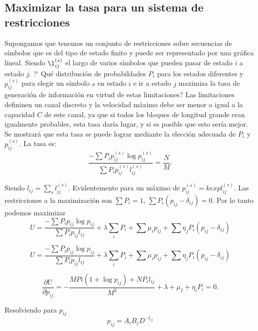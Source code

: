 \begin{appendices}
\clearpage

\chapter{Maximizar la tasa para un sistema de restricciones}
\label{a4}

Supongamos que tenemos un conjunto de restricciones sobre secuencias
de s\'imbolos que es del tipo de estado finito y puede ser
representado por una gr\'afica lineal. Siendo $\l_{ij}^{(s)}$ el largo
de varios s\'imbolos que pueden pasar de estado $i$ a estado $j$.  ?`
Qu\'e distribuci\'on de probabildades $P_{i}$ para los estados
diferentes y $p_{ij}^{(s)}$ para elegir un s\'imbolo $s$ en estado $i$
e ir a estado $j$ maximiza la tasa de generaci\'on de informaci\'on en
virtud de estas limitaciones? Las limitaciones defininen un canal
discreto y la velocidad m\'aximo debe ser menor o igual a la capacidad
$C$ de este canal, ya que si todos los bloques de longitud grande eran
igualmente probables, esta tasa dar\'ia lugar, y si es posible que
esto ser\'ia mejor. Se mostrar\'a que esta tasa se puede lograr
mediante la elecci\'on adecuada de $P_{i}$ y $p_{ij}^{(s)}$.  La tasa
es:
\begin{equation}
\frac{-\sum P_{i}p_{ij}^{(s)}\log p_{ij}^{(s)}}{\sum P_{i}p_{ij}^{(s)}l _{ij}^{(s)}} = \frac{N}{M}.
\end{equation}

Siendo $l_{ij}=\sum_{s}l _{ij}^{(s)}$. Evidentemente para un m\'aximo de 
$p_{ij}^{(s)}=k exp l_{ij}^{(s)}$. Las restricciones a la maximizaci\'on son 
$\sum P_{i} = 1$, $\sum P_{i}(p_{ij}-\delta_{ij})=0$. Por lo tanto podemos maximizar 
\begin{equation}
U=\frac{-\sum P_{i}p_{ij}\log p_{ij}}{\sum P_{i}p_{ij}l_{ij}}+\lambda \sum _{i}P_{i}+\sum\mu _{i}p_{ij}+\sum\eta _{j}P_{i}(p_{ij}-\delta_{ij})
\end{equation}

\begin{equation}
U=\frac{-\sum P_{i}p_{ij}\log p_{ij}}{\sum P_{i}p_{ij}l_{ij}}+\lambda \sum _{i}P_{i}+\sum\mu _{i}p_{ij}+\sum\eta _{j}P_{i}(p_{ij}-\delta_{ij})
\end{equation}

\begin{equation}
\frac {\partial U}{\partial p_{ij}}=-\frac{MP{i}(1+\log p_{ij})+NP_{i}l_{ij}}{M^{2}}+\lambda+\mu_{I}+\eta _{i}P_{i}=0.
\end{equation}

Resolviendo para $p_{ij}$
\begin{equation}
p_{ij}=A_{i}B_{j}D^{-l_{ij}}
\end{equation}


\end{appendices}
